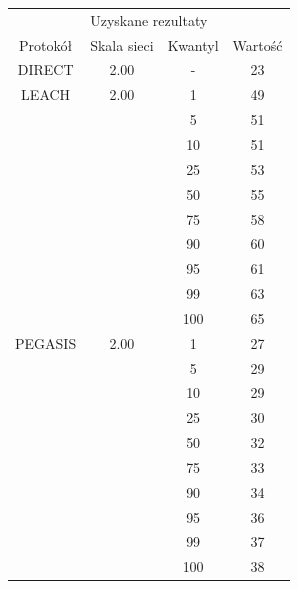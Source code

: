 \documentclass[a4paper,12pt,twoside,openany]{report}
\begin{document}
\begin{longtable}{*{4}{c}}
\toprule
\multicolumn{4}{c}{Uzyskane rezultaty} \\
Protokół	& Skala sieci	& Kwantyl	& Wartość \\
\midrule
\endhead
DIRECT	& 2.00 	& -	& 23 \\*
\midrule
LEACH	& 2.00	& 1	& 49 \\*	
	&	& 5	& 51 \\*
	&	& 10	& 51 \\*
	&	& 25	& 53 \\*
	&	& 50	& 55 \\*
	&	& 75	& 58 \\*
	&	& 90	& 60 \\*
	&	& 95	& 61 \\*
	&	& 99	& 63 \\*
	&	& 100	& 65 \\*
\midrule
PEGASIS	& 2.00	& 1	& 27 \\*
	&	& 5	& 29 \\*
	&	& 10	& 29 \\*
	&	& 25	& 30 \\*
	&	& 50	& 32 \\*
	&	& 75	& 33 \\*
	&	& 90	& 34 \\*
	&	& 95	& 36 \\*
	&	& 99	& 37 \\*
	&	& 100	& 38 \\*
\bottomrule
\end{longtable}
\end{document}
